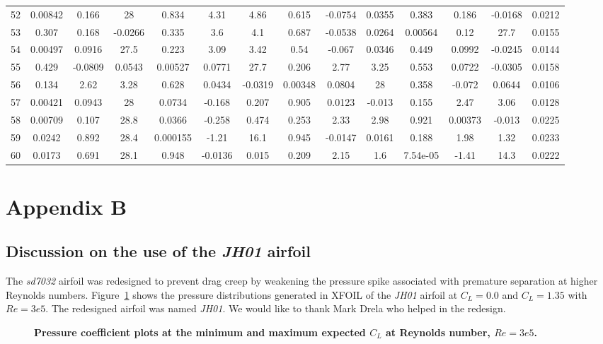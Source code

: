 \documentclass[]{aiaa-tc}%
\begin{document}
\begin{longtable}{lccccccccccccc}
52 & 0.00842 & 0.166 & 28 & 0.834 & 4.31 & 4.86 & 0.615 & -0.0754 & 0.0355 & 0.383 & 0.186 & -0.0168 & 0.0212\\
53 & 0.307 & 0.168 & -0.0266 & 0.335 & 3.6 & 4.1 & 0.687 & -0.0538 & 0.0264 & 0.00564 & 0.12 & 27.7 & 0.0155\\
54 & 0.00497 & 0.0916 & 27.5 & 0.223 & 3.09 & 3.42 & 0.54 & -0.067 & 0.0346 & 0.449 & 0.0992 & -0.0245 & 0.0144\\
55 & 0.429 & -0.0809 & 0.0543 & 0.00527 & 0.0771 & 27.7 & 0.206 & 2.77 & 3.25 & 0.553 & 0.0722 & -0.0305 & 0.0158\\
56 & 0.134 & 2.62 & 3.28 & 0.628 & 0.0434 & -0.0319 & 0.00348 & 0.0804 & 28 & 0.358 & -0.072 & 0.0644 & 0.0106\\
57 & 0.00421 & 0.0943 & 28 & 0.0734 & -0.168 & 0.207 & 0.905 & 0.0123 & -0.013 & 0.155 & 2.47 & 3.06 & 0.0128\\
58 & 0.00709 & 0.107 & 28.8 & 0.0366 & -0.258 & 0.474 & 0.253 & 2.33 & 2.98 & 0.921 & 0.00373 & -0.013 & 0.0225\\
59 & 0.0242 & 0.892 & 28.4 & 0.000155 & -1.21 & 16.1 & 0.945 & -0.0147 & 0.0161 & 0.188 & 1.98 & 1.32 & 0.0233\\
60 & 0.0173 & 0.691 & 28.1 & 0.948 & -0.0136 & 0.015 & 0.209 & 2.15 & 1.6 & 7.54e-05 & -1.41 & 14.3 & 0.0222 \\
\bottomrule
\end{longtable}
\normalsize

\section*{Appendix B}

\subsection{Discussion on the use of the \emph{JH01} airfoil}

The \emph{sd7032} airfoil was redesigned to prevent drag creep by weakening the pressure spike associated with premature separation at higher Reynolds numbers.  
Figure~\ref{f:jhcps} shows the pressure distributions generated in XFOIL of the \emph{JH01} airfoil at $C_L=0.0$ and $C_L=1.35$ with $Re=3e5$.
The redesigned airfoil was named \emph{JH01}. We would like to thank Mark Drela who helped in the redesign.

\begin{figure}[H]
 \begin{subfigmatrix}{2}%
 \end{subfigmatrix}
 \caption{\textbf{ Pressure coefficient plots at the minimum and maximum expected $C_L$ at Reynolds number, $Re=3e5$.  }}
 \label{f:jhcps}
\end{figure}
\end{document}
